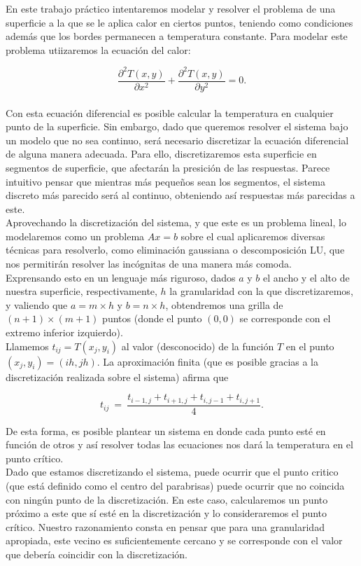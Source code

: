 En este trabajo práctico intentaremos modelar y resolver el problema de una superficie a la que se le aplica calor en ciertos puntos, teniendo como condiciones además que los bordes permanecen a temperatura constante. Para modelar este problema utiizaremos la ecuación del calor:

\begin{equation}
\frac{\partial^2T(x,y)}{\partial x^{2}}+\frac{\partial^2 T(x,y)}{\partial y^{2}} = 0.
\end{equation}\\

Con esta ecuación diferencial es posible calcular la temperatura en cualquier punto de la superficie. Sin embargo, dado que queremos resolver el sistema bajo un modelo que no sea continuo, será necesario discretizar la ecuación diferencial de alguna manera adecuada. Para ello, discretizaremos esta superficie en segmentos de superficie, que afectarán la presición de las respuestas. Parece intuitivo pensar que mientras más pequeños sean los segmentos, el sistema discreto más parecido será al continuo, obteniendo así respuestas más parecidas a este.
\\
Aprovechando la discretización del sistema, y que este es un problema lineal, lo modelaremos como un problema $Ax=b$ sobre el cual aplicaremos diversas técnicas para resolverlo, como eliminación gaussiana o descomposición LU, que nos permitirán resolver las incógnitas de una manera más comoda.
\\
Exprensando esto en un lenguaje más riguroso, dados $a$ y $b$ el ancho y el alto de nuestra superficie, respectivamente, $h$ la granularidad con la que discretizaremos, y valiendo que  $a = m\times h$ y $b = n \times h$, obtendremos una grilla de $(n+1)\times(m+1)$ puntos (donde el punto $(0,0)$ se corresponde con el extremo inferior izquierdo).
\\
Llamemos $t_{ij} = T(x_j,y_i)$ al valor (desconocido) de la función $T$ en el punto $(x_j, y_i) = (ih, jh)$. La aproximación finita (que es posible gracias a la discretización realizada sobre el sistema) afirma que

\begin{equation}
t_{ij} \ =\ \frac{ t_{i-1,j} + t_{i+1,j} + t_{i,j-1} + t_{i,j+1}}{4}.
\end{equation}

De esta forma, es posible plantear un sistema en donde cada punto esté en función de otros y así resolver todas las ecuaciones nos dará la temperatura en el punto crítico.
\\
Dado que estamos discretizando el sistema, puede ocurrir que el punto critico (que está definido como el centro del parabrisas) puede ocurrir que no coincida con ningún punto de la discretización. En este caso, calcularemos un punto próximo a este que sí esté en la discretización y lo consideraremos el punto crítico. Nuestro razonamiento consta en pensar que para una granularidad apropiada, este vecino es suficientemente cercano y se corresponde con el valor que debería coincidir con la discretización.

